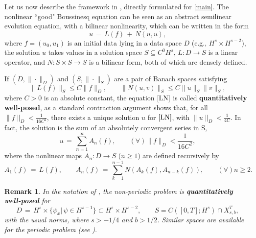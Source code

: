 \documentclass{amsart}
\newtheorem{remark}[theorem]{Remark}
\begin{document}
Let us now describe the framework in \cite{BT06}, directly formulated for \eqref{main}. The nonlinear ``good" Boussinesq equation can be seen as an abstract semilinear evolution equation, with a bilinear nonlinearity, which can be written in the form 
\begin{equation}
u\,=\,L(f)\,+\,N(u,u),
\label{LN}
\end{equation}
where $f=(u_0, u_1)$ is an initial data lying in a data space $D$ (e.g., $H^s \times H^{s-2}$), the solution $u$ takes values in a solution space $S \subseteq	 C^0H^s$, $L: D \to S$ is a linear operator, and $N:S\times S \to S$ is a bilinear form, both of which are densely defined.  

If  $(D,\|\cdot \|_D)$ and $(S,\|\cdot \|_S)$ are a pair of Banach spaces satisfying 
\begin{equation}
\|L(f)\|_S \leq C \|f\|_D,\qquad \|N(u,v)\|_S \leq C \|u\|_S \|v\|_S,
\label{estim}
\end{equation}
where $C>0$ is an absolute constant, the equation $\eqref{LN}$ is called \textbf{quantitatively well-posed}, as a standard contraction argument shows that, for all  $\|f\|_D<\frac{1}{16C^2}$, there exists a unique solution $u$ for $\eqref{LN}$, with $\|u\|_D<\frac{1}{4C}$. In fact, the solution is the sum of an absolutely convergent series in S, 
\begin{equation}
u\,=\,\sum_{n=1}^{\infty} A_n(f), \qquad (\forall) \|f\|_D<\frac{1}{16C^2},
\label{series}
\end{equation}
where the nonlinear maps $A_n: D\to S$ ($n\geq 1$) are defined recursively by
\begin{equation}
A_1(f)\,=\,L(f), \qquad A_n(f)\,=\,\sum_{k=1}^{n-1} N(A_k(f),A_{n-k}(f)), \qquad (\forall)n\geq 2.
\label{An}
\end{equation}


\begin{remark}
In the notation of \cite{F09}, the non-periodic problem is \textbf{quantitatively well-posed} for
\[
D\,=\,H^s\times \{\psi_x |\,\psi\in H^{s-1}\} \subset H^s\times H^{s-2}, \qquad S= C([0,T]; H^s)\cap X^T_{s,b},\]
with the usual norms, where $s>-1/4$ and $b>1/2$. Similar spaces are available for the periodic problem (see \cite{FS10}).
\label{qw}
\end{remark}
\end{document}
